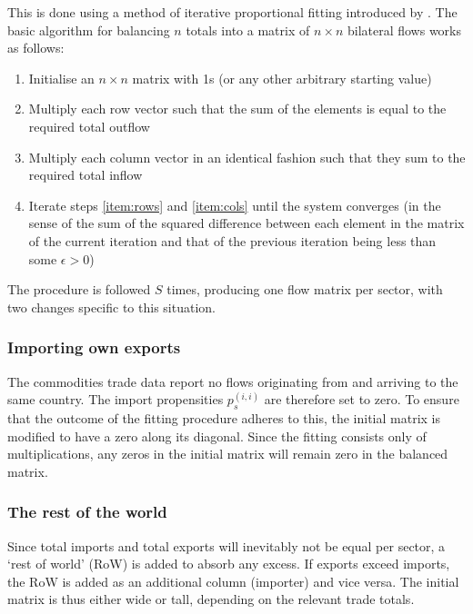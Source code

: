\documentclass[a4paper]{article}
\begin{document}
This is done using a method of iterative proportional fitting introduced by \textcite{deming_least_1940}.
The basic algorithm for balancing $n$ totals into a matrix of $n \times n$ bilateral flows works as follows:
\begin{enumerate}
\itemsep -0.2em 
\item Initialise an $n \times n$ matrix with 1s (or any other arbitrary starting value)
\item Multiply each row vector such that the sum of the elements is equal to the required total outflow \label{item:rows}
\item Multiply each column vector in an identical fashion such that they sum to the required total inflow \label{item:cols}
\item Iterate steps \ref{item:rows} and \ref{item:cols} until the system converges (in the sense of the sum of the squared difference between each element in the matrix of the current iteration and that of the previous iteration being less than some $\epsilon > 0$)
\end{enumerate}
The procedure is followed $S$ times, producing one flow matrix per sector, with two changes specific to this situation.
\subsubsection{Importing own exports}
The commodities trade data report no flows originating from and arriving to the same country.
The import propensities $p_s^{(i,i)}$ are therefore set to zero.
To ensure that the outcome of the fitting procedure adheres to this, the initial matrix is modified to have a zero along its diagonal.
Since the fitting consists only of multiplications, any zeros in the initial matrix will remain zero in the balanced matrix.

\subsubsection{The rest of the world}
Since total imports and total exports will inevitably not be equal per sector, a `rest of world' (RoW) is added to absorb any excess.
If exports exceed imports, the RoW is added as an additional column (importer) and vice versa.
The initial matrix is thus either wide or tall, depending on the relevant trade totals.
\end{document}

